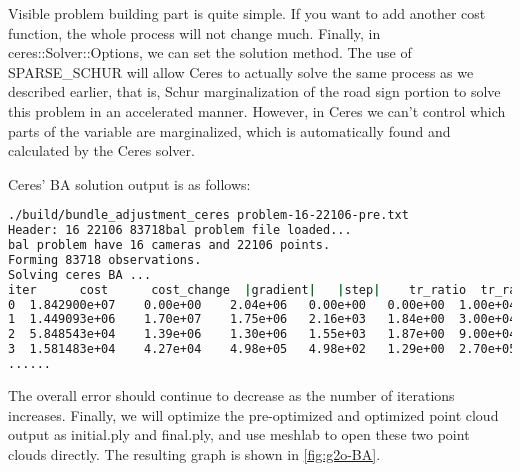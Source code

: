 Visible problem building part is quite simple. If you want to add another cost function, the whole process will not change much. Finally, in ceres::Solver::Options, we can set the solution method. The use of SPARSE\_SCHUR will allow Ceres to actually solve the same process as we described earlier, that is, Schur marginalization of the road sign portion to solve this problem in an accelerated manner. However, in Ceres we can't control which parts of the variable are marginalized, which is automatically found and calculated by the Ceres solver.

Ceres' BA solution output is as follows:
\begin{lstlisting}[language=sh,caption=terminal output]
./build/bundle_adjustment_ceres problem-16-22106-pre.txt
Header: 16 22106 83718bal problem file loaded...
bal problem have 16 cameras and 22106 points. 
Forming 83718 observations. 
Solving ceres BA ... 
iter      cost      cost_change  |gradient|   |step|    tr_ratio  tr_radius  ls_iter  iter_time  total_time
0  1.842900e+07    0.00e+00    2.04e+06   0.00e+00   0.00e+00  1.00e+04        0    6.10e-02    2.24e-01
1  1.449093e+06    1.70e+07    1.75e+06   2.16e+03   1.84e+00  3.00e+04        1    1.79e-01    4.03e-01
2  5.848543e+04    1.39e+06    1.30e+06   1.55e+03   1.87e+00  9.00e+04        1    1.56e-01    5.59e-01
3  1.581483e+04    4.27e+04    4.98e+05   4.98e+02   1.29e+00  2.70e+05        1    1.51e-01    7.10e-01
......
\end{lstlisting}
The overall error should continue to decrease as the number of iterations increases. Finally, we will optimize the pre-optimized and optimized point cloud output as initial.ply and final.ply, and use meshlab to open these two point clouds directly. The resulting graph is shown in \autoref{fig:g2o-BA}.

